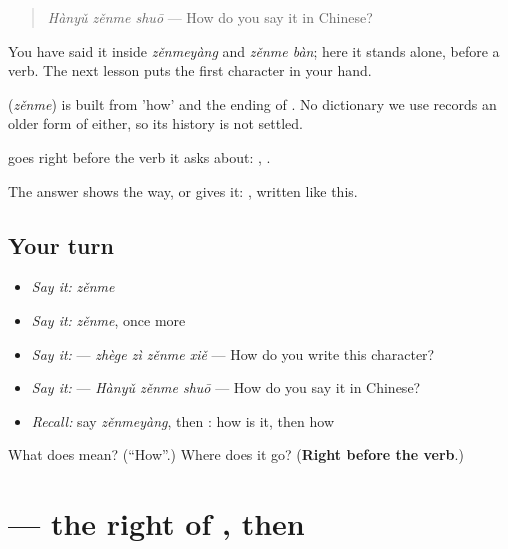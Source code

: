 \begin{quote}
\textbf{} \emph{Hànyǔ zěnme shuō} — How do you say it in Chinese?
\end{quote}

You have said it inside \emph{zěnmeyàng} and \emph{zěnme bàn}; here it stands alone, before a verb. The next lesson puts the first character in your hand.

\begin{cousinweb}
\textbf{} (\emph{zěnme}) is built from  'how' and the ending  of . No dictionary we use records an older form of either, so its history is not settled.
\end{cousinweb}

\begin{grammarlens}[title={What you've built}]
 goes right before the verb it asks about: , .

The answer shows the way, or gives it: , written like this.
\end{grammarlens}

\subsection*{Your turn}
\begin{itemize}
\raggedright
  \item \emph{Say it:} \emph{zěnme}
  \item \emph{Say it:} \emph{zěnme}, once more
  \item \emph{Say it:}  — \emph{zhège zì zěnme xiě} — How do you write this character?
  \item \emph{Say it:}  — \emph{Hànyǔ zěnme shuō} — How do you say it in Chinese?
  \item \emph{Recall:} say \emph{zěnmeyàng}, then : how is it, then how
\end{itemize}

\begin{tcolorbox}[breakable,colback=teal!4,colframe=teal!35!black,title={Before you move on}]
What does  mean? (\textquotedblleft{}How\textquotedblright{}.) Where does it go? (\textbf{Right before the verb}.)
\end{tcolorbox}
\section[\texorpdfstring{\zh{怎} (zěn)}{怎 (zěn)}]{ — the right of , then }


